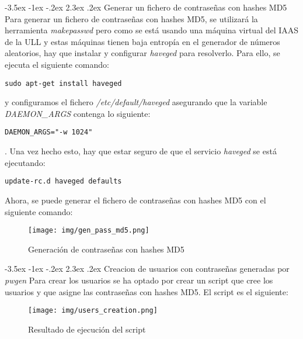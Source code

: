 \documentclass[11pt]{report}
\makeatletter
\renewcommand\chapter{\@startsection{chapter}{0}{\z@}%
    {-3.5ex \@plus -1ex \@minus -.2ex}%
    {2.3ex \@plus.2ex}%
    {\normalfont\Large\bfseries}}
\makeatother
\begin{document}
\chapter{Generar un fichero de contraseñas con hashes MD5}
Para generar un fichero de contraseñas con hashes MD5, se utilizará la herramienta \emph{makepasswd} pero 
como se está usando una máquina virtual del IAAS de la ULL y estas máquinas tienen
baja entropía en el generador de números aleatorios, hay que instalar y configurar \emph{haveged} para
resolverlo. Para ello, se ejecuta el siguiente comando:
\begin{BVerbatim}
sudo apt-get install haveged
\end{BVerbatim}
y configuramos el fichero \emph{/etc/default/haveged} asegurando que la variable \emph{DAEMON\_ARGS} 
contenga lo siguiente:
\begin{BVerbatim}
DAEMON_ARGS="-w 1024"
\end{BVerbatim}
. Una vez hecho esto, hay que estar seguro de que el servicio \emph{haveged} se está ejecutando:
\begin{BVerbatim}
update-rc.d haveged defaults
\end{BVerbatim}

Ahora, se puede generar el fichero de contraseñas con hashes MD5 con el siguiente comando:
\lstset{style=mystyle}


\begin{figure}[H]
  \centering
  \texttt{[image: img/gen\_pass\_md5.png]}
  \caption{Generación de contraseñas con hashes MD5}
  \label{fig:generación de contraseñas con hashes MD5}
\end{figure}

\cleardoublepage

\chapter{Creacion de usuarios con contraseñas generadas por \emph{pwgen}}
Para crear los usuarios se ha optado por crear un script que cree los usuarios y que asigne las contraseñas
con hashes MD5. El script es el siguiente:
\lstset{style=mystyle}


\begin{figure}[H]
  \centering
  \texttt{[image: img/users\_creation.png]}
  \caption{Resultado de ejecución del script}
\end{figure}
\end{document}
